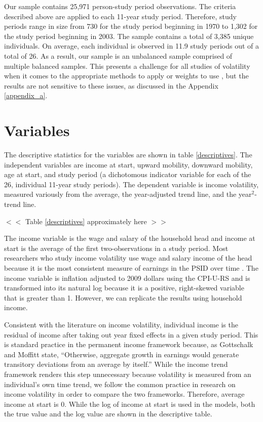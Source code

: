 \documentclass[12pt]{article}
\begin{document}
Our sample contains 25,971 person-study period observations. The criteria described above are applied to each 11-year study period. Therefore, study periods range in size from 730 for the study period beginning in 1970 to 1,302 for the study period beginning in 2003. The sample contains a total of 3,385 unique individuals. On average, each individual is observed in 11.9 study periods out of a total of 26. As a result, our sample is an unbalanced sample comprised of multiple balanced samples.  This presents a challenge for all studies of volatility when it comes to the appropriate methods to apply or weights to use \citep{nichols_rehm_2014}, but the results are not sensitive to these issues, as discussed in the Appendix \ref{appendix_a}.

\section{Variables}

The descriptive statistics for the variables are shown in table \ref{descriptives}. The independent variables are income at start, upward mobility, downward mobility, age at start, and study period (a dichotomous indicator variable for each of the 26, individual 11-year study periods). The dependent variable is income volatility, measured variously from the average, the year-adjusted trend line, and the year$^2$-trend line.
\begin{center}
$<<$ Table \ref{descriptives} approximately here $>>$ 
\end{center}
The income variable is the wage and salary of the household head and income at start is the average of the first two-observations in a study period. Most researchers who study income volatility use wage and salary income of the head because it is the most consistent measure of earnings in the PSID over time \citep[pg. 977]{shin_solon_2011}. The income variable is inflation adjusted to 2009 dollars using the CPI-U-RS and is transformed into its natural log because it is a positive, right-skewed variable that is greater than 1.  However, we can replicate the results using household income.

Consistent with the literature on income volatility, individual income is the residual of income after taking out year fixed effects in a given study period. This is standard practice in the permanent income framework because, as Gottschalk and Moffitt \citeyearpar{gottschalk_moffitt_2009} state, ``Otherwise, aggregate growth in earnings would generate transitory deviations from an average by itself.'' While the income trend framework renders this step unnecessary because volatility is measured from an individual's own time trend, we follow the common practice in research on income volatility in order to compare the two frameworks. Therefore, average income at start is 0. While the log of income at start is used in the models, both the true value and the log value are shown in the descriptive table.
\end{document}
